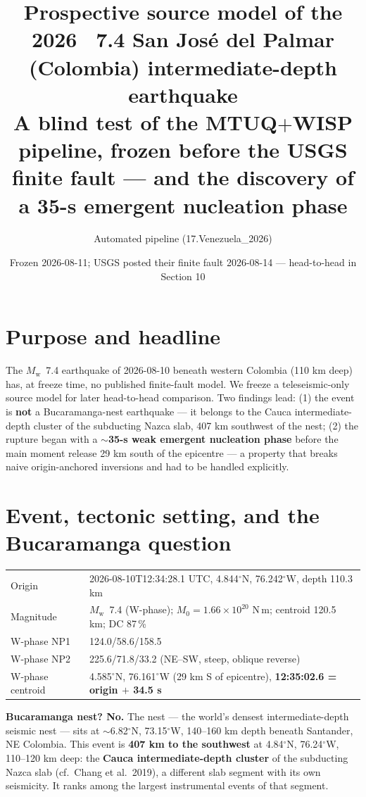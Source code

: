 \documentclass[11pt]{article}
\title{\textbf{Prospective source model of the 2026 \Mw~7.4 San Jos\'e del Palmar (Colombia)
intermediate-depth earthquake}\\
\large A blind test of the MTUQ$+$WISP pipeline, frozen before the USGS finite fault ---
and the discovery of a 35-s emergent nucleation phase}
\author{Automated pipeline (17.Venezuela\_2026)}
\date{Frozen 2026-08-11; USGS posted their finite fault 2026-08-14 --- head-to-head in Section 10}
\newcommand{\Mw}{$M_{\mathrm w}$}
\begin{document}
\maketitle

\section*{Purpose and headline}
The \Mw~7.4 earthquake of 2026-08-10 beneath western Colombia (110 km deep) has, at freeze
time, no published finite-fault model. We freeze a teleseismic-only source model for later
head-to-head comparison. Two findings lead: (1) the event is \textbf{not} a Bucaramanga-nest
earthquake --- it belongs to the Cauca intermediate-depth cluster of the subducting Nazca slab,
407 km southwest of the nest; (2) the rupture began with a \textbf{$\sim$35-s weak emergent
nucleation phase} before the main moment release 29 km south of the epicentre --- a property
that breaks naive origin-anchored inversions and had to be handled explicitly.

\section{Event, tectonic setting, and the Bucaramanga question}
\begin{table}[H]\centering\small
\begin{tabular}{ll}
\toprule
Origin & 2026-08-10T12:34:28.1 UTC, 4.844$^\circ$N, 76.242$^\circ$W, depth 110.3 km \\
Magnitude & \Mw~7.4 (W-phase); $M_0=1.66\times10^{20}$ N\,m; centroid 120.5 km; DC 87\,\% \\
W-phase NP1 & 124.0/58.6/158.5 \\
W-phase NP2 & 225.6/71.8/33.2 \quad (NE--SW, steep, oblique reverse) \\
W-phase centroid & 4.585$^\circ$N, 76.161$^\circ$W (29 km S of epicentre), \textbf{12:35:02.6 = origin $+$ 34.5 s} \\
\bottomrule
\end{tabular}
\end{table}

\textbf{Bucaramanga nest? No.} The nest --- the world's densest intermediate-depth seismic
nest --- sits at $\sim$6.82$^\circ$N, 73.15$^\circ$W, 140--160 km depth beneath Santander, NE
Colombia. This event is \textbf{407 km to the southwest} at 4.84$^\circ$N, 76.24$^\circ$W,
110--120 km deep: the \textbf{Cauca intermediate-depth cluster} of the subducting Nazca slab
(cf.\ Chang et al.\ 2019), a different slab segment with its own seismicity. It ranks among
the largest instrumental events of that segment.
\end{document}
